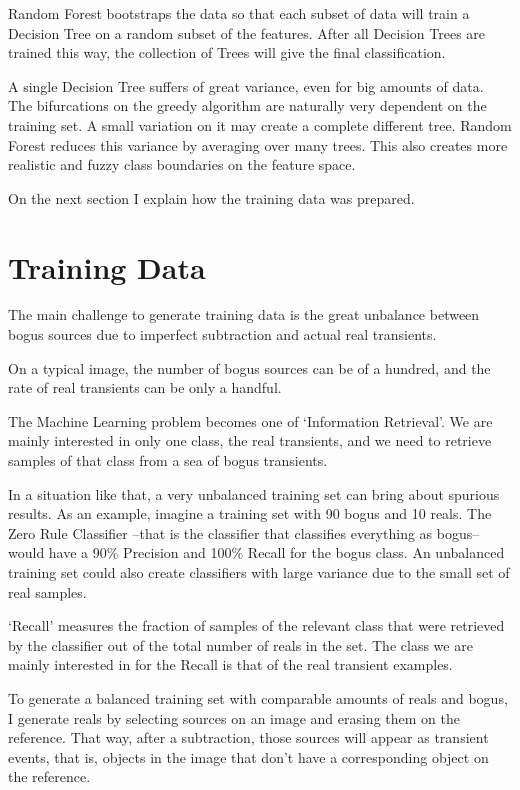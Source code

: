 Random Forest bootstraps the data so that each subset of data will train a Decision Tree on a random subset of the features. After all Decision Trees are trained this way, the collection of Trees will give the final classification.

A single Decision Tree suffers of great variance, even for big amounts of data. The bifurcations on the greedy algorithm are naturally very dependent on the training set. A small variation on it may create a complete different tree. Random Forest reduces this variance by averaging over many trees. This also creates more realistic and fuzzy class boundaries on the feature space.

On the next section I explain how the training data was prepared.

\section{Training Data}

The main challenge to generate training data is the great unbalance between bogus sources due to imperfect subtraction and actual real transients.

On a typical image, the number of bogus sources can be of a hundred, and the rate of real transients can be only a handful. 

The Machine Learning problem becomes one of `Information Retrieval'. We are mainly interested in only one class, the real transients, and we need to retrieve samples of that class from a sea of bogus transients.

In a situation like that, a very unbalanced training set can bring about spurious results. As an example, imagine a training set with 90 bogus and 10 reals. The Zero Rule Classifier --that is the classifier that classifies everything as bogus-- would have a 90\% Precision and 100\% Recall for the bogus class. An unbalanced training set could also create classifiers with large variance due to the small set of real samples.

`Recall' measures the fraction of samples of the relevant class that were retrieved by the classifier out of the total number of reals in the set.
The class we are mainly interested in for the Recall is that of the real transient examples.

To generate a balanced training set with comparable amounts of reals and bogus, I generate reals by selecting sources on an image and erasing them on the reference. That way, after a subtraction, those sources will appear as transient events, that is, objects in the image that don't have a corresponding object on the reference.

